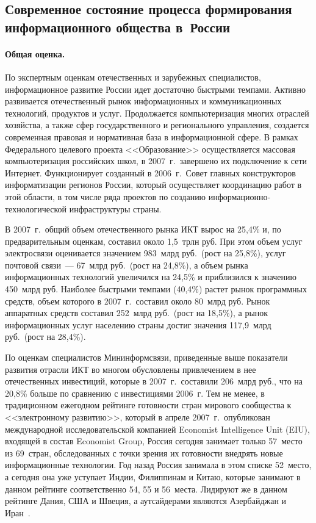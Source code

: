 \begin{multicols}{2}
\section{Современное состояние процесса формирования
информационного общества в~России}

\vspace*{-3pt}
\paragraph*{Общая оценка.} По экспертным оценкам отечественных и зарубежных
специалистов, информационное развитие России идет достаточно быстрыми темпами.
Активно развивается отечественный рынок информационных и коммуникационных
технологий, продуктов и услуг. Продолжается компьютеризация многих отраслей
хозяйства, а также сфер государственного и регионального управления, создается
современная правовая и нормативная база в информационной сфере. В рамках
Федерального целевого проекта <<Образование>> осуществляется массовая
компьютеризация российских школ, в 2007~г.\ завершено их подключение к сети
Интернет. Функционирует созданный в 2006~г.\ Совет главных конструкторов
информатизации регионов России, который осуществляет координацию работ в этой
области, в том числе ряда проектов по созданию информационно-технологической
инфраструктуры страны.

   В 2007~г.\ общий объем отечественного рынка ИКТ вырос на 25,4\% и, по
предварительным оценкам, составил около 1,5~трлн руб. При этом объем услуг
электросвязи оценивается значением 983~млрд руб.\ (рост на 25,8\%), услуг 
почтовой связи~--- 67~млрд руб.\ (рост на 24,8\%), а объем рынка информационных 
технологий увеличился на 24,5\% и приблизился к значению 450~млрд руб. Наиболее 
быстрыми темпами (40,4\%) растет рынок про\-грам\-мных средств, объем которого 
в 2007~г.\ составил около 80~млрд руб. Рынок аппаратных средств составил 
252~млрд руб.\ (рост на 18,5\%), а рынок информационных услуг населению страны 
достиг значения 117,9~млрд руб.\ (рост на 28,4\%).

   По оценкам специалистов Мининформсвязи, приведенные выше показатели развития
отрасли ИКТ во многом обусловлены привлечением в нее отечественных инвестиций,
которые в 2007~г.\ составили 206~млрд руб., что на 20,8\% больше по сравнению с
инвестициями 2006~г. Тем не менее, в традиционном ежегодном рейтинге готовности
стран мирового сообщества к <<электронному развитию>>, который в апреле 2007~г.\
опубликован международной исследовательской компанией Economist Intelligence Unit
(EIU), входящей в состав Economist Group, Россия сегодня занимает только 57~место из
69~стран, обследованных с точки зрения их го\-тов\-ности внедрять новые информационные
технологии. Год назад Россия занимала в этом списке 52~место, а сегодня она уже
уступает Индии, Филиппинам и Китаю, которые занимают в данном рейтинге
соответственно 54, 55 и 56~места. Лидируют же в данном рейтинге Дания, США и
Швеция, а аутсайдерами являются Азербайджан и Иран~\cite{1ss}.


\end{multicols}
